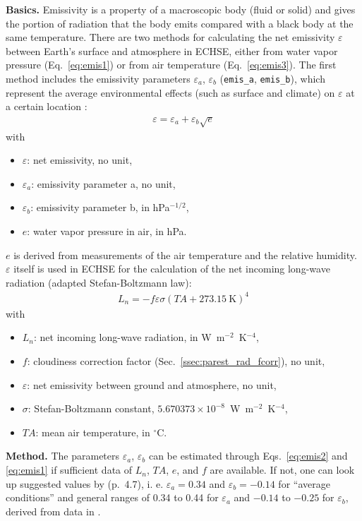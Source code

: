 \documentclass{scrreprt}
\newenvironment{denseitem}{
  \begin{itemize}
    \setlength{\itemsep}{0pt}
    \setlength{\parskip}{0pt}
    \setlength{\parsep}{0pt}
}{
  \end{itemize}
}
\begin{document}
\textbf{Basics.}
Emissivity is a property of a macroscopic body (fluid or solid) and gives the portion of radiation that the body emits compared with a black body at the same temperature.
There are two methods for calculating the net emissivity $\varepsilon$ between Earth's surface and atmosphere in ECHSE, either from water vapor pressure (Eq.~\ref{eq:emis1}) or from air temperature (Eq.~\ref{eq:emis3}).
The first method includes the emissivity parameters $\varepsilon_a$, $\varepsilon_b$ (\verb!emis_a!, \verb!emis_b!), which represent the average environmental effects (such as surface and climate) on $\varepsilon$ at a certain location \citep{brunt32}:
\begin{align} \label{eq:emis1}
  \varepsilon = \varepsilon_a + \varepsilon_b \sqrt{e}
\end{align}
%
with
\begin{denseitem}
  \item[] $\varepsilon$: net emissivity, no unit,
  \item[] $\varepsilon_a$: emissivity parameter a, no unit,
  \item[] $\varepsilon_b$: emissivity parameter b, in hPa$^{-1/2}$,
  \item[] $e$: water vapor pressure in air, in hPa.
\end{denseitem}
%
$e$ is derived from measurements of the air temperature and the relative humidity.
$\varepsilon$ itself is used in ECHSE for the calculation of the net incoming long-wave radiation (adapted Stefan-Boltzmann law):
\begin{align} \label{eq:emis2}
  L_n = -f \varepsilon \sigma (TA + 273.15~\text{K})^4
\end{align}
%
with
\begin{denseitem}
  \item[] $L_n$: net incoming long-wave radiation, in W~m$^{-2}$~K$^{-4}$,
  \item[] $f$: cloudiness correction factor (Sec.~\ref{ssec:parest_rad_fcorr}), no unit,
  \item[] $\varepsilon$: net emissivity between ground and atmosphere, no unit,
  \item[] $\sigma$: Stefan-Boltzmann constant, $5.670373 \times 10^{-8}$~W~m$^{-2}$~K$^{-4}$,
  \item[] ${TA}$: mean air temperature, in $^\circ$C.
\end{denseitem}

\textbf{Method.}
The parameters $\varepsilon_a$, $\varepsilon_b$ can be estimated through Eqs.~\eqref{eq:emis2} and \eqref{eq:emis1} if sufficient data of $L_n$, $TA$, $e$, and $f$ are available.
If not, one can look up suggested values by \citet{maidment93} (p.~4.7), i. e. $\varepsilon_a = 0.34$ and $\varepsilon_b = -0.14$ for ``average conditions'' and general ranges of 0.34 to 0.44 for $\varepsilon_a$ and $-0.14$ to $-0.25$ for $\varepsilon_b$, derived from data in \citet{fao77}.
\end{document}
